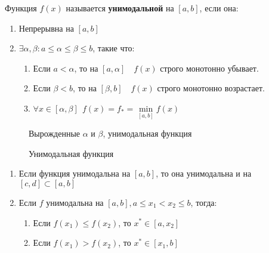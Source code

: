 \begin{definition}
    Функция \(f(x)\) называется \textbf{унимодальной} на \([a, b]\), если она:
    \begin{enumerate}
        \item Непрерывна на \([a, b]\)
        \item \(\exists \alpha, \beta : a \leq \alpha \leq \beta \leq b\), такие что:
              \begin{enumerate}
                  \item Если \(a < \alpha\), то на \([a, \alpha] \quad f(x)\) строго монотонно убывает.
                  \item Если \(\beta < b\), то на \([\beta, b] \quad f(x)\) строго монотонно возрастает.
                  \item \(\forall x\in [\alpha, \beta] \ \ f(x) = f_* = \min\limits_{[a, b]} f(x)\)
              \end{enumerate}
    \end{enumerate}
\end{definition}

\begin{figure}[h]
    \centering
    \begin{minipage}{0.5\textwidth}
        \centering
        
        \caption{Вырожденные \(\alpha\) и \(\beta\), унимодальная функция}
    \end{minipage}%
    \begin{minipage}{0.5\textwidth}
        \centering
        
        \caption{Унимодальная функция}
    \end{minipage}
\end{figure}

\begin{prop}\itemfix
    \begin{enumerate}
        \item Если функция унимодальна на \([a, b]\), то она унимодальна и на \([c, d] \subset [a, b]\)
        \item Если \(f\) унимодальна на \([a, b], a \leq x_1 < x_2 \leq b\), тогда:
              \begin{enumerate}
                  \item Если \(f(x_1) \leq f(x_2)\), то \(x^*\in [a, x_2]\)
                  \item Если \(f(x_1) > f(x_2)\), то \(x^*\in[x_1, b]\)
              \end{enumerate}
    \end{enumerate}
\end{prop}

